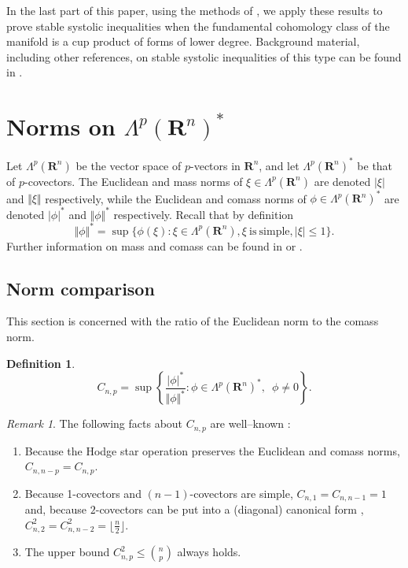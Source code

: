 \documentclass[12pt]{amsart}
\theoremstyle{definition}
\newtheorem{definition}[theorem]{Definition}
\theoremstyle{remark}
\newtheorem{remark}[theorem]{Remark}
\numberwithin{equation}{section}
\begin{document}
 In the last part  of this paper, using the methods of \cite{GHK}, we  apply these results to prove stable systolic inequalities when the fundamental cohomology class of the manifold is a cup product of forms of lower degree.  Background material, including other references, on stable systolic inequalities of this type can be found in \cite{MK}.

\section{Norms on $\Lambda^p(\mathbf{R}^n)^\ast$}%

Let $\Lambda^p(\mathbf{R}^n)$  be the vector space  of $p$-vectors in $\mathbf{R}^n$,  and let $\Lambda^p(\mathbf{R}^n)^\ast$  be that of $p$-covectors.  The Euclidean and mass norms of $\xi \in \Lambda^p(\mathbf{R}^n)$ are denoted $|\xi|$ and $\Vert\xi\Vert$ respectively, while the Euclidean and comass norms of $\phi\in \Lambda^p(\mathbf{R}^n)^\ast$ are denoted $|\phi|^\ast$ and $\Vert\phi\Vert^\ast$ respectively. Recall that by definition
\begin{equation*}
\Vert \phi \Vert^\ast = \sup\{\phi(\xi) : \xi\in\Lambda^p(\mathbf{R}^n), \xi \mathrm {\ is\ simple}, |\xi|\leq 1\}.
\end{equation*}
Further  information on mass and comass can be found in \cite[1.81]{HF} or \cite[Chapter I, \S13]{HW}.

\subsection{Norm comparison}%

 This section is concerned with the ratio of the  Euclidean norm to the comass norm.


\begin{definition}
\begin{equation*}
 C_{n,p} = \sup \left\{ \frac {|\phi|^\ast}{\Vert \phi \Vert ^\ast} : \phi \in \Lambda^p(\mathbf{R}^n)^\ast, \enspace \phi\neq 0\right\}. 
 \end{equation*}
\end{definition}

\begin{remark}\label{r:1} The following facts about $C_{n,p}$ are well--known \cite{HF,HW}:

\begin{enumerate}
\item Because the Hodge star operation preserves the Euclidean and comass norms, $C_{n,n-p} = C_{n,p}$.
\item Because 1-covectors and $(n-1)$-covectors are simple, $C_{n,1} = C_{n,n-1} =1$ and, because $2$-covectors can be put into a (diagonal) canonical form \cite[Theorem 5.1, p. 24]{SS} ,  $C^2_{n,2}=C^2_{n,n-2} = \lfloor \frac n2\rfloor $.
\item The  upper bound $C_{n,p}^2 \leq \binom{n}{p}$ always holds.
\end{enumerate}

\end{remark}
\end{document}
